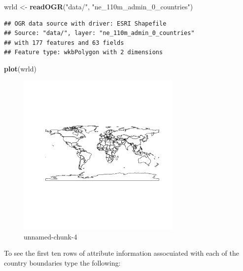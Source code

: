 \documentclass[]{article}
\newenvironment{Shaded}{}{}
\newcommand{\KeywordTok}[1]{\textcolor[rgb]{0.00,0.44,0.13}{\textbf{{#1}}}}
\newcommand{\StringTok}[1]{\textcolor[rgb]{0.25,0.44,0.63}{{#1}}}
\newcommand{\NormalTok}[1]{{#1}}
\let\Oldincludegraphics\includegraphics
\renewcommand{\includegraphics}[1]{\Oldincludegraphics[width=8cm]{#1}}
\begin{document}
\begin{Shaded}
\begin{Highlighting}[]
\NormalTok{wrld <- }\KeywordTok{readOGR}\NormalTok{(}\StringTok{"data/"}\NormalTok{, }\StringTok{"ne_110m_admin_0_countries"}\NormalTok{)}
\end{Highlighting}
\end{Shaded}
\begin{verbatim}
## OGR data source with driver: ESRI Shapefile 
## Source: "data/", layer: "ne_110m_admin_0_countries"
## with 177 features and 63 fields
## Feature type: wkbPolygon with 2 dimensions
\end{verbatim}
\begin{Shaded}
\begin{Highlighting}[]
\KeywordTok{plot}\NormalTok{(wrld)}
\end{Highlighting}
\end{Shaded}
\begin{figure}[htbp]
\centering
\includegraphics{figure/unnamed-chunk-4.png}
\caption{unnamed-chunk-4}
\end{figure}

To see the first ten rows of attribute information assocuiated with each
of the country boundaries type the following:
\end{document}
